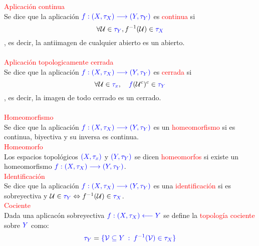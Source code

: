 \documentclass{article}
\begin{document}
\textcolor{red}{Aplicación continua}\\
Se dice que la aplicación $\textcolor{blue}{f:(X,\tau_X)\longrightarrow (Y, \tau_Y)}$ es \textcolor{red}{continua} si
$$
\forall \mathcal{U}\in \textcolor{blue}{\tau_Y}, f^{-1}(\mathcal{U})\in \textcolor{blue}{\tau_X}
$$
, es decir, la antiimagen de cualquier abierto es un abierto.\\\\

\textcolor{red}{Aplicación topologicamente cerrada}\\
Se dice que la aplicación $\textcolor{blue}{f:(X,\tau_X)\longrightarrow (Y, \tau_Y)}$ es \textcolor{red}{cerrada} si
$$
\forall \mathcal{U} \in \textcolor{blue}{\tau_x}, \quad \textcolor{blue}{f}(\mathcal{U}^c)^c\in \textcolor{blue}{\tau_Y}
$$
, es decir, la imagen de todo cerrado es un cerrado.\\\\

\textcolor{red}{Homeomorfismo}\\
Se dice que la aplicación $\textcolor{blue}{f:(X,\tau_X)\longrightarrow (Y, \tau_Y)}$ es un \textcolor{red}{homeomorfismo} si es continua, biyectiva y su inversa es continua.\\

\textcolor{red}{Homeomorfo}\\
Los espacios topológicos $\textcolor{blue}{(X,\tau_x)}$ y $\textcolor{blue}{(Y,\tau_Y)}$ se dicen \textcolor{red}{homeomorfos} si existe un homeomorfismo $\textcolor{blue}{f:(X,\tau_X)\longrightarrow (Y, \tau_Y)}$.\\

\textcolor{red}{Identificación}\\
Se dice que la aplicación $\textcolor{blue}{f:(X,\tau_X)\longrightarrow (Y, \tau_Y)}$ es una \textcolor{red}{identificación} si es sobreyectiva y $\mathcal{U}\in \textcolor{blue}{\tau_Y} \Leftrightarrow f^{-1}(\mathcal{U})\in \textcolor{blue}{\tau_X}$.\\

\textcolor{red}{Cociente}\\
Dada una aplicacón sobreyectiva $\textcolor{blue}{f:(X, \tau_X) \longleftarrow Y}$ se define la \textcolor{red}{topología cociente} sobre $\textcolor{blue}{Y}$ como:
$$
\textcolor{blue}{\tau_Y} = \textcolor{blue}{\{\mathcal{V}\subseteq Y \: :\: f^{-1}(\mathcal{V})\in\tau_X\}}
$$
\end{document}
